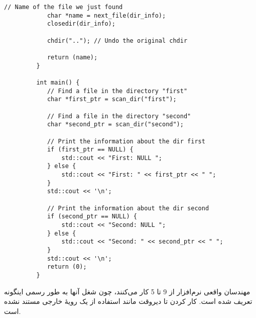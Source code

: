 \begin{LTR}
\begin{lstlisting}[style=C++Style]
         	// Name of the file we just found
         	char *name = next_file(dir_info);
         	closedir(dir_info);

         	chdir(".."); // Undo the original chdir

         	return (name);
         }

         int main() {
         	// Find a file in the directory "first"
         	char *first_ptr = scan_dir("first");

         	// Find a file in the directory "second"
         	char *second_ptr = scan_dir("second");

         	// Print the information about the dir first
         	if (first_ptr == NULL) {
         		std::cout << "First: NULL ";
         	} else {
         		std::cout << "First: " << first_ptr << " ";
         	}
         	std::cout << '\n';

         	// Print the information about the dir second
         	if (second_ptr == NULL) {
         		std::cout << "Second: NULL ";
         	} else {
         		std::cout << "Second: " << second_ptr << " ";
         	}
         	std::cout << '\n';
         	return (0);
         }
    \end{lstlisting}
\end{LTR}

\begin{tcolorbox}
    مهندسان واقعی نرم‌افزار از 9 تا 5 کار می‌کنند، چون شغل آنها به طور رسمی اینگونه تعریف شده است. کار کردن تا دیروقت مانند استفاده از یک رویهٔ خارجی مستند نشده است.
\end{tcolorbox}